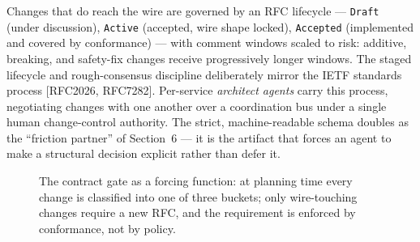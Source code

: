 \documentclass[11pt]{article}
\begin{document}
Changes that do reach the wire are governed by an RFC lifecycle --- \texttt{Draft} (under discussion),
\texttt{Active} (accepted, wire shape locked), \texttt{Accepted} (implemented and covered by
conformance) --- with comment windows scaled to risk: additive, breaking, and safety-fix changes
receive progressively longer windows. The staged lifecycle and rough-consensus discipline deliberately
mirror the IETF standards process [RFC2026, RFC7282]. Per-service \emph{architect agents} carry this process,
negotiating changes with one another over a coordination bus under a single human change-control
authority. The strict, machine-readable schema doubles as the ``friction partner'' of Section~6 --- it
is the artifact that forces an agent to make a structural decision explicit rather than defer it.
\begin{figure}[H]\centering
{}
  \caption{The contract gate as a forcing function: at planning time every change is classified into
  one of three buckets; only wire-touching changes require a new RFC, and the requirement is enforced
  by conformance, not by policy.}\label{fig:gate}
\end{figure}
\end{document}
